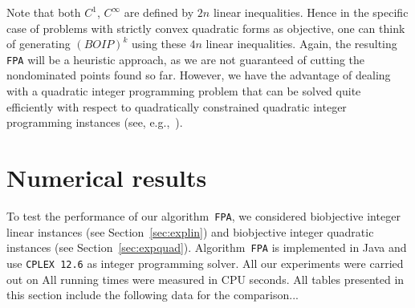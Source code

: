 \documentclass[preprint,12pt]{elsarticle}
\newtheorem{proposition}[theorem]{Proposition}
\def\Z{\mathbb{Z}}
\begin{document}
Note that both $C^1$, $C^\infty$ are defined by $2n$ linear inequalities.
Hence in the specific case of problems with strictly convex quadratic forms as objective,
one can think of generating $(BOIP)^k$ using these $4n$ linear inequalities.
Again, the resulting \texttt{FPA} will be a heuristic approach, as we are not guaranteed
of cutting the nondominated points found so far. However, we have the advantage of dealing with a quadratic integer programming
problem that can be solved quite efficiently with respect
to quadratically constrained quadratic integer programming instances (see, e.g.,~\cite{buchheim:2016}).




\section{Numerical results}\label{sec:numres}
To test the performance of our algorithm~\texttt{FPA}, we considered biobjective integer linear instances (see Section~\ref{sec:explin}) and
biobjective integer quadratic instances (see Section~\ref{sec:expquad}).
Algorithm~\texttt{FPA} is implemented in Java and use \texttt{CPLEX 12.6}  as integer programming solver.
All our experiments were carried out on
All running times were measured in CPU seconds.
All tables presented in this section include the following data for the
comparison...
\end{document}
